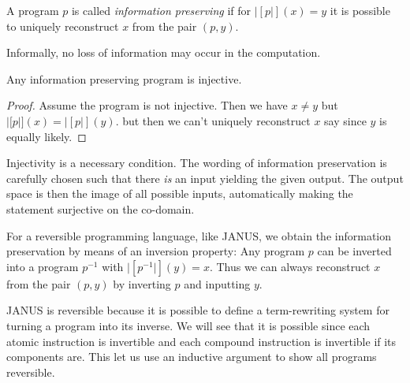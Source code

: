 \begin{defn}
  A program $p$ is called \emph{information preserving} if for
  $|[p|](x) = y$ it is possible to uniquely reconstruct $x$ from the
  pair $(p, y)$.
\end{defn}
Informally, no loss of information may occur in the computation.

\begin{thm}
  Any information preserving program is injective.
\end{thm}
\begin{proof}
  Assume the program is not injective. Then we have $x \neq y$ but
  $|[p|](x) = |[p|](y)$. but then we can't uniquely reconstruct $x$
  say since $y$ is equally likely.
\end{proof}
Injectivity is a necessary condition. The wording of information
preservation is carefully chosen such that there \emph{is} an input
yielding the given output. The output space is then the image of all
possible inputs, automatically making the statement surjective on the
co-domain.

For a reversible programming language, like JANUS, we obtain the
information preservation by means of an inversion property: Any
program $p$ can be inverted into a program $p^{-1}$ with
$|[p^{-1}|](y) = x$. Thus we can always reconstruct $x$ from the pair
$(p, y)$ by inverting $p$ and inputting $y$.

JANUS is reversible because it is possible to define a term-rewriting
system for turning a program into its inverse. We will see that it is
possible since each atomic instruction is invertible and each compound
instruction is invertible if its components are. This let us use an
inductive argument to show all programs reversible.


